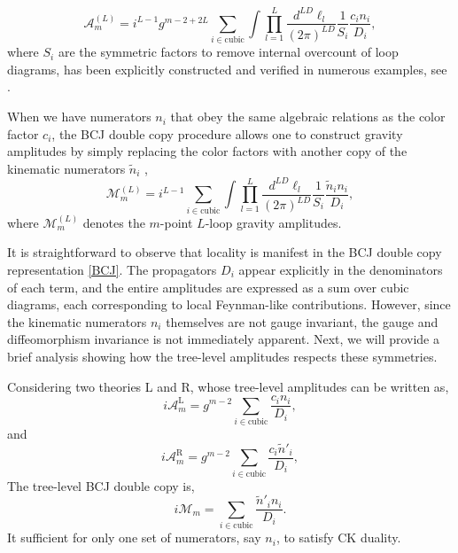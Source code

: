 \documentclass[a4paper,11pt]{article}
\begin{document}
\begin{equation}
    \mathcal{A}^{(L)}_m=i^{L-1}g^{m-2+2L}\sum_{i\in \text{cubic}}\int\prod_{l=1}^{L}\frac{d^{LD} \ell_l}{(2 \pi)^{LD}}\frac{1}{S_i}\frac{c_i n_i}{D_i},
\end{equation}
where $S_i$ are the symmetric factors to remove internal overcount of loop diagrams, has been explicitly constructed and verified in numerous examples, see \cite{Bern:2010ue,Bern:2012uf,Carrasco:2015iwa}.\par
When we have numerators $n_i$ that obey the same algebraic relations as the color factor $c_i$, 
the BCJ double copy procedure allows one to construct gravity amplitudes by simply replacing the color factors with another copy of the kinematic numerators $\tilde{n}_i$ \cite{Bern:2008qj,Bern:2010ue},
\begin{equation}\label{BCJ}
    \mathcal{M}^{(L)}_m=i^{L-1}\sum_{i\in \text{cubic}}\int\prod_{l=1}^{L}\frac{d^{LD} \ell_l}{(2 \pi)^{LD}}\frac{1}{S_i}\frac{\tilde{n}_i n_i}{D_i},
\end{equation}
where $\mathcal{M}_m^{(L)}$ denotes the $m$-point $L$-loop gravity amplitudes.\par
It is straightforward to observe that locality is manifest in the BCJ double copy representation \eqref{BCJ}. The propagators $D_i$ appear explicitly in the denominators of each term, 
and the entire amplitudes are expressed as a sum over cubic diagrams, each corresponding to local Feynman-like contributions. 
However, since the kinematic numerators $n_i$ themselves are not gauge invariant, the gauge and diffeomorphism invariance is not immediately apparent. 
Next, we will provide a brief analysis showing how the tree-level amplitudes respects these symmetries.\par
Considering two theories L and R, whose tree-level amplitudes can be written as,
\begin{equation}
    i \mathcal{A}_m^{\mathrm L}=g^{m-2}\sum_{i\in \text{cubic}}\frac{c_i n_i}{D_i},
\end{equation} 
and
\begin{equation}\label{Racn}
    i \mathcal{A}_m^{\mathrm R}=g^{m-2}\sum_{i\in \text{cubic}}\frac{c_i \tilde{n}'_i}{D_i},
\end{equation} 
The tree-level BCJ double copy is,
\begin{equation}\label{tree-BCJ}
    i \mathcal{M}_m=\sum_{i\in \text{cubic}}\frac{\tilde{n}'_i n_i}{D_i}.
\end{equation}
It sufficient for only one set of numerators, say $n_i$, to satisfy CK duality. 
\end{document}

